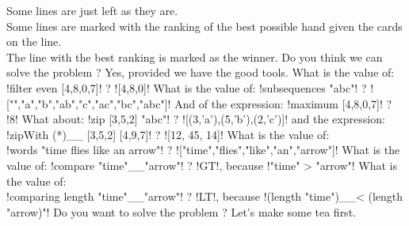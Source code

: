 \lhleft Some lines are just left as they are. \\
Some lines are marked with the ranking of the best possible hand given the cards on the line.\\
The line with the best ranking is marked as the winner.
\lhnext Do you think we can solve the problem ?
\lhleft Yes, provided we have the good tools.
\lhnext What is the value of:  \il!filter even [4,8,0,7]! ?
\lhleft \il![4,8,0]!
\lhnext What is the value of:  \il!subsequences "abc"! ?
\lhleft \il!["","a","b","ab","c","ac","bc","abc"]!
\lhnext And of the expression: \il!maximum [4,8,0,7]! ? 
\lhleft \il!8!
\lhnext What about: \il!zip [3,5,2] "abc"! ?
\lhleft \il![(3,'a'),(5,'b'),(2,'c')]!
\lhnext and  the expression: \il!zipWith (*)__ [3,5,2] [4,9,7]! ?
\lhleft \il![12, 45, 14]!
\lhnext What is the value of: \\ \il!words "time flies like an arrow"! ?
\lhleft \il!["time","flies","like","an","arrow"]!
\lhnext What is the value of: \il!compare "time"__"arrow"! ?
\lhleft \il!GT!, because \il!"time" > "arrow"!
\lhnext What is the value of:\\ \il!comparing length "time"__"arrow"! ?
\lhleft \il!LT!, because \il!(length "time")__< (length "arrow)"!
\lhnext Do you want to solve the problem ? 
\lhleft Let's make some tea first.
\lhend








